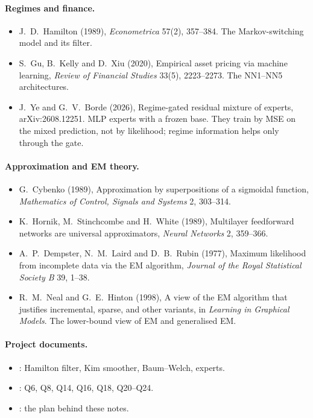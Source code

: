 \paragraph{Regimes and finance.}
\begin{itemize}
  \item J.~D.~Hamilton (1989), \emph{Econometrica} 57(2), 357--384. The Markov-switching model and its filter.
  \item S.~Gu, B.~Kelly and D.~Xiu (2020), Empirical asset pricing via machine learning, \emph{Review of Financial Studies} 33(5), 2223--2273. The NN1--NN5 architectures.
  \item J.~Ye and G.~V.~Borde (2026), Regime-gated residual mixture of experts, arXiv:2608.12251. MLP experts with a frozen base. They train by MSE on the mixed prediction, not by likelihood; regime information helps only through the gate.
\end{itemize}

\paragraph{Approximation and EM theory.}
\begin{itemize}
  \item G.~Cybenko (1989), Approximation by superpositions of a sigmoidal function, \emph{Mathematics of Control, Signals and Systems} 2, 303--314.
  \item K.~Hornik, M.~Stinchcombe and H.~White (1989), Multilayer feedforward networks are universal approximators, \emph{Neural Networks} 2, 359--366.
  \item A.~P.~Dempster, N.~M.~Laird and D.~B.~Rubin (1977), Maximum likelihood from incomplete data via the EM algorithm, \emph{Journal of the Royal Statistical Society B} 39, 1--38.
  \item R.~M.~Neal and G.~E.~Hinton (1998), A view of the EM algorithm that justifies incremental, sparse, and other variants, in \emph{Learning in Graphical Models}. The lower-bound view of EM and generalised EM.
\end{itemize}

\paragraph{Project documents.}
\begin{itemize}
  \item {}: Hamilton filter, Kim smoother, Baum--Welch, experts.
  \item {}: Q6, Q8, Q14, Q16, Q18, Q20--Q24.
  \item {}: the plan behind these notes.
\end{itemize}
